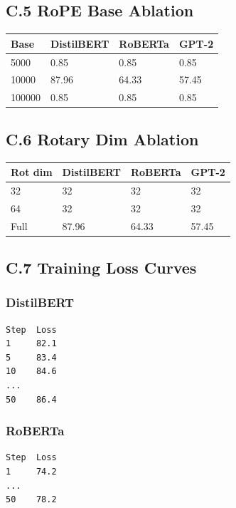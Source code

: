 {\subsection{C.5 RoPE Base Ablation}

\begin{table}[H]
\centering
\small
\begin{tabular}{llll}
\toprule
\textbf{Base} & \textbf{DistilBERT} & \textbf{RoBERTa} & \textbf{GPT-2} \\
\midrule
5000 & 0.85 & 0.85 & 0.85 \\
10000 & 87.96 & 64.33 & 57.45 \\
100000 & 0.85 & 0.85 & 0.85 \\
\bottomrule
\end{tabular}
\end{table}

\subsection{C.6 Rotary Dim Ablation}

\begin{table}[H]
\centering
\small
\begin{tabular}{llll}
\toprule
\textbf{Rot dim} & \textbf{DistilBERT} & \textbf{RoBERTa} & \textbf{GPT-2} \\
\midrule
32 & 32 & 32 & 32 \\
64 & 32 & 32 & 32 \\
Full & 87.96 & 64.33 & 57.45 \\
\bottomrule
\end{tabular}
\end{table}

\subsection{C.7 Training Loss Curves}

\subsubsection{DistilBERT}
\begin{lstlisting}
Step  Loss
1     82.1
5     83.4
10    84.6
...
50    86.4
\end{lstlisting}

\subsubsection{RoBERTa}
\begin{lstlisting}
Step  Loss
1     74.2
...
50    78.2
\end{lstlisting}

}
